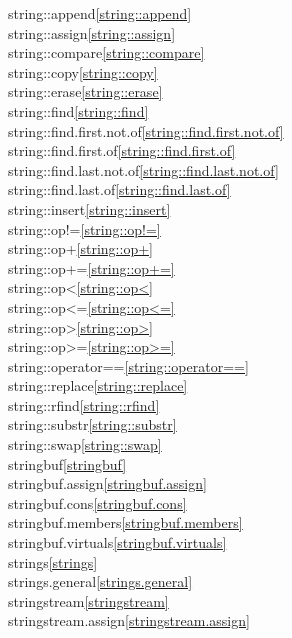 \begin{multicols}{2}
string::append\quad\ref{string::append}\\
string::assign\quad\ref{string::assign}\\
string::compare\quad\ref{string::compare}\\
string::copy\quad\ref{string::copy}\\
string::erase\quad\ref{string::erase}\\
string::find\quad\ref{string::find}\\
string::find.first.not.of\quad\ref{string::find.first.not.of}\\
string::find.first.of\quad\ref{string::find.first.of}\\
string::find.last.not.of\quad\ref{string::find.last.not.of}\\
string::find.last.of\quad\ref{string::find.last.of}\\
string::insert\quad\ref{string::insert}\\
string::op!=\quad\ref{string::op!=}\\
string::op+\quad\ref{string::op+}\\
string::op+=\quad\ref{string::op+=}\\
string::op<\quad\ref{string::op<}\\
string::op<=\quad\ref{string::op<=}\\
string::op>\quad\ref{string::op>}\\
string::op>=\quad\ref{string::op>=}\\
string::operator==\quad\ref{string::operator==}\\
string::replace\quad\ref{string::replace}\\
string::rfind\quad\ref{string::rfind}\\
string::substr\quad\ref{string::substr}\\
string::swap\quad\ref{string::swap}\\
stringbuf\quad\ref{stringbuf}\\
stringbuf.assign\quad\ref{stringbuf.assign}\\
stringbuf.cons\quad\ref{stringbuf.cons}\\
stringbuf.members\quad\ref{stringbuf.members}\\
stringbuf.virtuals\quad\ref{stringbuf.virtuals}\\
strings\quad\ref{strings}\\
strings.general\quad\ref{strings.general}\\
stringstream\quad\ref{stringstream}\\
stringstream.assign\quad\ref{stringstream.assign}\\

\end{multicols}
